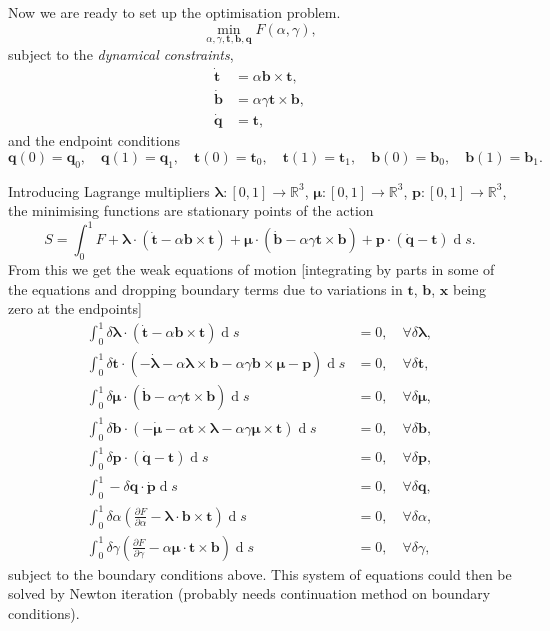 \documentclass{article}
\def\MM#1{\boldsymbol{#1}}
\newcommand{\pp}[2]{\frac{\partial #1}{\partial #2}}
\def\MM#1{\boldsymbol{#1}}
\DeclareMathOperator{\diff}{d}
\begin{document}
Now we are ready to set up the optimisation problem.
\begin{equation}
  \min_{\alpha,\gamma,\MM{t},\MM{b},\MM{q}}F(\alpha,\gamma),
\end{equation}
subject to the \emph{dynamical constraints},
\begin{align}
  \dot{\MM{t}} &= \alpha\MM{b}\times \MM{t}, \\
  \dot{\MM{b}} & = \alpha\gamma\MM{t}\times \MM{b}, \\
  \dot{\MM{q}} & = \MM{t},
\end{align}
and the endpoint conditions
\begin{equation}
  \MM{q}(0)=\MM{q}_0, \quad
  \MM{q}(1)=\MM{q}_1, \quad
  \MM{t}(0)=\MM{t}_0, \quad
  \MM{t}(1)=\MM{t}_1, \quad
  \MM{b}(0)=\MM{b}_0, \quad
  \MM{b}(1)=\MM{b}_1.
\end{equation}

Introducing Lagrange multipliers $\MM{\lambda}:[0,1]\to\mathbb{R}^3$,
$\MM{\mu}:[0,1]\to\mathbb{R}^3$, $\MM{p}:[0,1]\to \mathbb{R}^3$,
the minimising functions are stationary points of the action
\begin{equation}
  S = \int_0^1 F + \MM{\lambda}\cdot\left(\dot{\MM{t}}-\alpha\MM{b}\times\MM{t}
  \right)
  + \MM{\mu}\cdot\left(\dot{\MM{b}}-\alpha\gamma\MM{t}\times\MM{b}\right)
  + \MM{p}\cdot\left(\dot{\MM{q}}-\MM{t}\right)\diff s.
\end{equation}
From this we get the weak equations of motion [integrating by parts in
  some of the equations and dropping boundary terms due to variations
in $\MM{t}$, $\MM{b}$, $\MM{x}$ being zero at the endpoints]
\begin{align}
  \int_0^1 \delta \MM{\lambda}\cdot \left(\dot{\MM{t}}-\alpha\MM{b}\times\MM{t}
  \right)\diff s & = 0, \quad \forall \delta\MM{\lambda}, \\
  \int_0^1 \delta \MM{t} \cdot
  \left( -\dot{\MM{\lambda}} - \alpha\MM{\lambda}\times \MM{b}
  -\alpha\gamma \MM{b}\times\MM{\mu} - \MM{p}\right)\diff s & = 0,
  \quad \forall \delta\MM{t}, \\
  \int_0^1 \delta \MM{\mu}\cdot \left(\dot{\MM{b}}-\alpha\gamma\MM{t}\times\MM{b}
  \right)\diff s & = 0, \quad \forall \delta\MM{\mu}, \\
  \int_0^1 \delta \MM{b}\cdot \left(-\dot{\MM{\mu}}
  -\alpha\MM{t}\times\MM{\lambda}
  -\alpha\gamma\MM{\mu}\times\MM{t}
  \right)\diff s & = 0, \quad \forall \delta\MM{b}, \\
  \int_0^1 \delta \MM{p}\cdot \left(\dot{\MM{q}}-\MM{t}\right)\diff s &= 0,
  \quad \forall \delta\MM{p}, \\
  \int_0^1 -\delta\MM{q}\cdot \dot{\MM{p}}\diff s & = 0, \quad
  \forall \delta \MM{q}, \\
  \int_0^1 \delta\alpha\left(\pp{F}{\alpha}-\MM{\lambda}\cdot\MM{b}\times
  \MM{t}\right)\diff s & = 0, \quad \forall \delta\alpha, \\
  \int_0^1 \delta\gamma\left(\pp{F}{\gamma}-\alpha\MM{\mu}\cdot\MM{t}\times
  \MM{b}\right)\diff s & = 0, \quad \forall \delta\gamma,
\end{align}
subject to the boundary conditions above. This system of equations
could then be solved by Newton iteration (probably needs continuation
method on boundary conditions).
\end{document}
